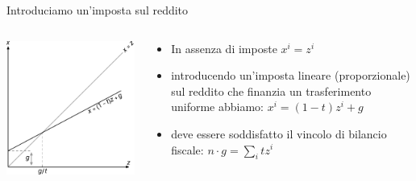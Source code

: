 \documentclass[aspectratio=64,11pt]{beamer}
\begin{document}
\begin{frame}{Introduciamo un'imposta sul reddito}
\begin{columns}
\begin{column}{.55\columnwidth}
\begin{center}
\includegraphics[width=\textwidth]{./figure/effetto-distorsivo-imposte-ql-2.pdf}
\end{center}
\end{column}


\begin{column}{.45\columnwidth}
\begin{itemize}
\item In assenza di imposte $x^i=z^i$
\item introducendo un'imposta lineare (proporzionale) sul reddito che finanzia un
trasferimento uniforme abbiamo: $x^i=(1-t)z^i+g$
\item deve essere soddisfatto il vincolo di bilancio fiscale: $n\cdot g=\sum_itz^i$
\end{itemize}
\end{column}
\end{columns}
\end{frame}
\end{document}
